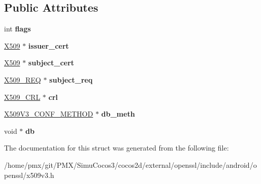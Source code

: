 \subsection*{Public Attributes}
\begin{DoxyCompactItemize}
\item 
\mbox{\label{structv3__ext__ctx_aef13996482523a866443b3160db73291}} 
int {\bfseries flags}
\item 
\mbox{\label{structv3__ext__ctx_aeb18083620b3b56a443ccda4063306b9}} 
\hyperlink{structx509__st}{X509} $\ast$ {\bfseries issuer\+\_\+cert}
\item 
\mbox{\label{structv3__ext__ctx_a5c5ddfa2bd6bfe780ac5e0bd63a6098f}} 
\hyperlink{structx509__st}{X509} $\ast$ {\bfseries subject\+\_\+cert}
\item 
\mbox{\label{structv3__ext__ctx_afe7ffb5a2590a3b4c5dfeb5fc8a29cb2}} 
\hyperlink{structX509__req__st}{X509\+\_\+\+R\+EQ} $\ast$ {\bfseries subject\+\_\+req}
\item 
\mbox{\label{structv3__ext__ctx_a06109cd8096c4c27fed10be1a788644e}} 
\hyperlink{structX509__crl__st}{X509\+\_\+\+C\+RL} $\ast$ {\bfseries crl}
\item 
\mbox{\label{structv3__ext__ctx_ad18c205ac4d3b6cf25746e4165459ea8}} 
\hyperlink{structX509V3__CONF__METHOD__st}{X509\+V3\+\_\+\+C\+O\+N\+F\+\_\+\+M\+E\+T\+H\+OD} $\ast$ {\bfseries db\+\_\+meth}
\item 
\mbox{\label{structv3__ext__ctx_a4f643c1ec24b886a431b29cf7702ec52}} 
void $\ast$ {\bfseries db}
\end{DoxyCompactItemize}


The documentation for this struct was generated from the following file\+:\begin{DoxyCompactItemize}
\item 
/home/pmx/git/\+P\+M\+X/\+Simu\+Cocos3/cocos2d/external/openssl/include/android/openssl/x509v3.\+h\end{DoxyCompactItemize}
